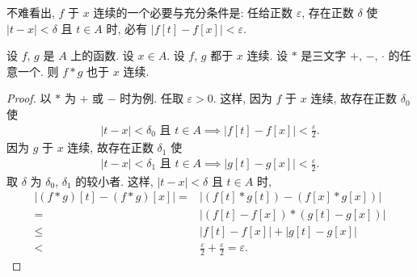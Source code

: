 不难看出,
$f$ 于 $x$ 连续的一个必要与充分条件是:
任给正数 $\varepsilon$,
存在正数 $\delta$ 使
$|t - x| < \delta$ 且 $t \in A$ 时,
必有 $|f[t] - f[x]| < \varepsilon$.

\begin{theorem}
    设 $f$, $g$ 是 $A$ 上的函数.
    设 $x \in A$.
    设 $f$, $g$ 都于 $x$ 连续.
    设 $\ast$ 是三文字 $+$, $-$, $\cdot$ 的任意一个.
    则 $f \ast g$ 也于 $x$ 连续.
\end{theorem}

\begin{proof}
    以 $\ast$ 为 $+$ 或 $-$ 时为例.
    任取 $\varepsilon > 0$.
    这样, 因为 $f$ 于 $x$ 连续,
    故存在正数 $\delta_0$ 使
    \begin{align*}
        \text{$|t - x| < \delta_0$ 且 $t \in A$} \implies |f[t] - f[x]| < \frac{\varepsilon}{2}.
    \end{align*}
    因为 $g$ 于 $x$ 连续,
    故存在正数 $\delta_1$ 使
    \begin{align*}
        \text{$|t - x| < \delta_1$ 且 $t \in A$} \implies |g[t] - g[x]| < \frac{\varepsilon}{2}.
    \end{align*}
    取 $\delta$ 为 $\delta_0$, $\delta_1$ 的较小者.
    这样, $|t - x| < \delta$ 且 $t \in A$ 时,
    \begin{align*}
        {|(f \ast g)[t] - (f \ast g)[x]|}
        = {}    & {|(f[t] \ast g[t]) - (f[x] \ast g[x])|}       \\
        = {}    & {|(f[t] - f[x]) \ast (g[t] - g[x])|}          \\
        \leq {} & {|f[t] - f[x]| + |g[t] - g[x]|}               \\
        < {}    & \frac{\varepsilon}{2} + \frac{\varepsilon}{2}
        = \varepsilon.
    \end{align*}


\end{proof}
